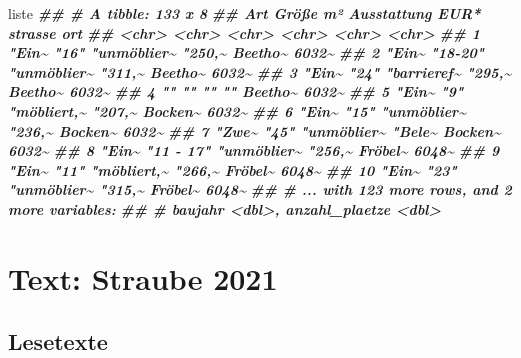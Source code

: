 \documentclass[
  ngerman,
]{article}
\newenvironment{Shaded}{\begin{snugshade}}{\end{snugshade}}
\newcommand{\DocumentationTok}[1]{\textcolor[rgb]{0.56,0.35,0.01}{\textbf{\textit{#1}}}}
\newcommand{\NormalTok}[1]{#1}
\begin{document}
\begin{Shaded}
\begin{Highlighting}[]
\NormalTok{liste}
\DocumentationTok{\#\# \# A tibble: 133 x 8}
\DocumentationTok{\#\#    Art   \textasciigrave{}Größe m²\textasciigrave{} Ausstattung \textasciigrave{}EUR*\textasciigrave{} strasse ort  }
\DocumentationTok{\#\#    \textless{}chr\textgreater{} \textless{}chr\textgreater{}      \textless{}chr\textgreater{}       \textless{}chr\textgreater{}  \textless{}chr\textgreater{}   \textless{}chr\textgreater{}}
\DocumentationTok{\#\#  1 "Ein\textasciitilde{} "16"       "unmöblier\textasciitilde{} "250,\textasciitilde{} Beetho\textasciitilde{} 6032\textasciitilde{}}
\DocumentationTok{\#\#  2 "Ein\textasciitilde{} "18{-}20"    "unmöblier\textasciitilde{} "311,\textasciitilde{} Beetho\textasciitilde{} 6032\textasciitilde{}}
\DocumentationTok{\#\#  3 "Ein\textasciitilde{} "24"       "barrieref\textasciitilde{} "295,\textasciitilde{} Beetho\textasciitilde{} 6032\textasciitilde{}}
\DocumentationTok{\#\#  4 ""    ""         ""          ""     Beetho\textasciitilde{} 6032\textasciitilde{}}
\DocumentationTok{\#\#  5 "Ein\textasciitilde{} "9"        "möbliert,\textasciitilde{} "207,\textasciitilde{} Bocken\textasciitilde{} 6032\textasciitilde{}}
\DocumentationTok{\#\#  6 "Ein\textasciitilde{} "15"       "unmöblier\textasciitilde{} "236,\textasciitilde{} Bocken\textasciitilde{} 6032\textasciitilde{}}
\DocumentationTok{\#\#  7 "Zwe\textasciitilde{} "45"       "unmöblier\textasciitilde{} "Bele\textasciitilde{} Bocken\textasciitilde{} 6032\textasciitilde{}}
\DocumentationTok{\#\#  8 "Ein\textasciitilde{} "11 {-} 17"  "unmöblier\textasciitilde{} "256,\textasciitilde{} Fröbel\textasciitilde{} 6048\textasciitilde{}}
\DocumentationTok{\#\#  9 "Ein\textasciitilde{} "11"       "möbliert,\textasciitilde{} "266,\textasciitilde{} Fröbel\textasciitilde{} 6048\textasciitilde{}}
\DocumentationTok{\#\# 10 "Ein\textasciitilde{} "23"       "unmöblier\textasciitilde{} "315,\textasciitilde{} Fröbel\textasciitilde{} 6048\textasciitilde{}}
\DocumentationTok{\#\# \# ... with 123 more rows, and 2 more variables:}
\DocumentationTok{\#\# \#   baujahr \textless{}dbl\textgreater{}, anzahl\_plaetze \textless{}dbl\textgreater{}}
\end{Highlighting}
\end{Shaded}

\hypertarget{text-straube-2021}{%
\section{Text: Straube 2021}\label{text-straube-2021}}

\hypertarget{lesetexte}{%
\subsection{Lesetexte}\label{lesetexte}}
\end{document}
